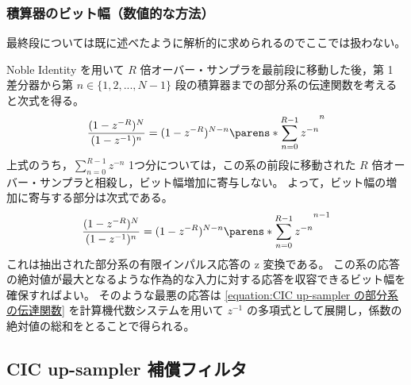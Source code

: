         \subsubsection{積算器のビット幅（数値的な方法）}
            最終段については既に述べたように解析的に求められるのでここでは扱わない。
            \par
            Noble Identity を用いて $R$ 倍オーバー・サンプラを最前段に移動した後，第 1 差分器から第 $n\in\{1,2,...,N-1\}$ 段の積算器までの部分系の伝達関数を考えると次式を得る。
            \[ \frac{(1-z^{-R})^N}{(1-z^{-1})^n} = (1-z^{-R})^{N-n}\parens*{\sum_{n=0}^{R-1} z^{-n}}^n \]
            上式のうち，$\sum_{n=0}^{R-1} z^{-n}$ 1つ分については，この系の前段に移動された $R$ 倍オーバー・サンプラと相殺し，ビット幅増加に寄与しない。
            よって，ビット幅の増加に寄与する部分は次式である。
            \begin{equation}
                \frac{(1-z^{-R})^N}{(1-z^{-1})^n} = (1-z^{-R})^{N-n}\parens*{\sum_{n=0}^{R-1} z^{-n}}^{n-1} \label{equation:CIC up-sampler の部分系の伝達関数}
            \end{equation}
            これは抽出された部分系の有限インパルス応答の z 変換である。
            この系の応答の絶対値が最大となるような作為的な入力に対する応答を収容できるビット幅を確保すればよい。
            そのような最悪の応答は \cref{equation:CIC up-sampler の部分系の伝達関数} を計算機代数システムを用いて $z^{-1}$ の多項式として展開し，係数の絶対値の総和をとることで得られる。
    \subsection{CIC up-sampler 補償フィルタ}
        \newcommand{\HCNF}{H_\text{C,NF}}

